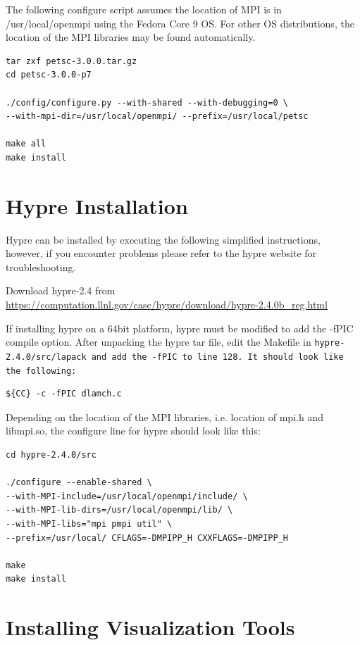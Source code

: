 \documentclass[12pt]{article}
\begin{document}
The following configure script assumes the location of MPI is in
/usr/local/openmpi using the Fedora Core 9 OS.  For other OS
distributions, the location of the MPI libraries may be found
automatically.

\begin{Verbatim}
tar zxf petsc-3.0.0.tar.gz
cd petsc-3.0.0-p7

./config/configure.py --with-shared --with-debugging=0 \ 
--with-mpi-dir=/usr/local/openmpi/ --prefix=/usr/local/petsc

make all
make install
\end{Verbatim}

\section{Hypre Installation}

Hypre can be installed by executing the following simplified
instructions, however, if you encounter problems please refer to the
hypre website for troubleshooting.

Download hypre-2.4 from
\url{https://computation.llnl.gov/casc/hypre/download/hypre-2.4.0b\_reg.html}

If installing hypre on a 64bit platform, hypre must be modified to add
the -fPIC compile option.  After unpacking the hypre tar file, edit
the Makefile in \tt hypre-2.4.0/src/lapack \normalfont and add the
-fPIC to line 128.  It should look like the following:

\begin{verbatim}
${CC} -c -fPIC dlamch.c
\end{verbatim}

Depending on the location of the MPI libraries, i.e. location of mpi.h
and libmpi.so, the configure line for hypre should look like this:
\begin{verbatim}
cd hypre-2.4.0/src

./configure --enable-shared \
--with-MPI-include=/usr/local/openmpi/include/ \
--with-MPI-lib-dirs=/usr/local/openmpi/lib/ \
--with-MPI-libs="mpi pmpi util" \
--prefix=/usr/local/ CFLAGS=-DMPIPP_H CXXFLAGS=-DMPIPP_H

make
make install
\end{verbatim}

 

\section{Installing Visualization Tools}
\end{document}
